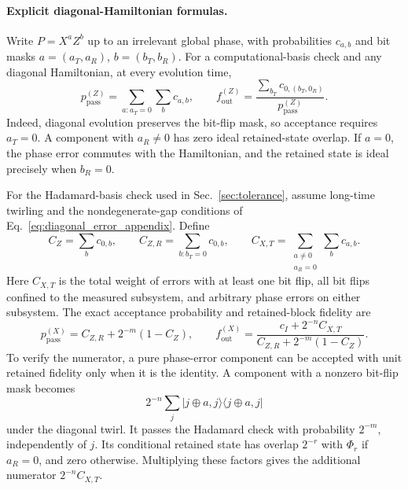 \documentclass[onecolumn,prx,longbibliography,nofootinbib, superscriptaddress]{revtex4-2}
\theoremstyle{recap}
\begin{document}
\paragraph{Explicit diagonal-Hamiltonian formulas.}
Write $P=X^aZ^b$ up to an irrelevant global phase, with probabilities $c_{a,b}$ and bit masks $a=(a_T,a_R)$, $b=(b_T,b_R)$. For a computational-basis check and any diagonal Hamiltonian, at every evolution time,
\begin{equation}\label{eq:diagonal_Z_fidelity}
    p_{\mathrm{pass}}^{(Z)}=\sum_{a:a_T=0}\sum_b c_{a,b},\qquad
    f_{\mathrm{out}}^{(Z)}=
    \frac{\sum_{b_T}c_{0,(b_T,0_R)}}{p_{\mathrm{pass}}^{(Z)}}.
\end{equation}
Indeed, diagonal evolution preserves the bit-flip mask, so acceptance requires $a_T=0$. A component with $a_R\neq0$ has zero ideal retained-state overlap. If $a=0$, the phase error commutes with the Hamiltonian, and the retained state is ideal precisely when $b_R=0$.

For the Hadamard-basis check used in Sec.~\ref{sec:tolerance}, assume long-time twirling and the nondegenerate-gap conditions of Eq.~\eqref{eq:diagonal_error_appendix}. Define
\begin{equation}\label{eq:diagonal_noise_weights}
    C_Z=\sum_b c_{0,b},\qquad
    C_{Z,R}=\sum_{b:b_T=0}c_{0,b},\qquad
    C_{X,T}=\sum_{\substack{a\neq0\\a_R=0}}\sum_b c_{a,b}.
\end{equation}
Here $C_{X,T}$ is the total weight of errors with at least one bit flip, all bit flips confined to the measured subsystem, and arbitrary phase errors on either subsystem. The exact acceptance probability and retained-block fidelity are
\begin{equation}\label{eq:diagonal_X_fidelity}
    p_{\mathrm{pass}}^{(X)}=C_{Z,R}+2^{-m}(1-C_Z),\qquad
    f_{\mathrm{out}}^{(X)}=
    \frac{c_I+2^{-n}C_{X,T}}{C_{Z,R}+2^{-m}(1-C_Z)}.
\end{equation}
To verify the numerator, a pure phase-error component can be accepted with unit retained fidelity only when it is the identity. A component with a nonzero bit-flip mask becomes
\begin{equation}
    2^{-n}\sum_j|j\oplus a,j\rangle\langle j\oplus a,j|
\end{equation}
under the diagonal twirl. It passes the Hadamard check with probability $2^{-m}$, independently of $j$. Its conditional retained state has overlap $2^{-r}$ with $\Phi_r$ if $a_R=0$, and zero otherwise. Multiplying these factors gives the additional numerator $2^{-n}C_{X,T}$.
\end{document}
